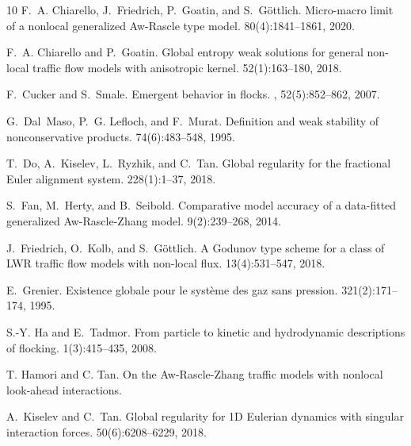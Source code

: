 \documentclass[11pt,a4paper,oneside]{amsart}
\begin{document}
\begin{thebibliography}{10}
 F.~A. Chiarello, J.~Friedrich, P.~Goatin, and S.~G\"ottlich.
\newblock Micro-macro limit of a nonlocal generalized {A}w-{R}ascle type model.
 80(4):1841--1861, 2020.

 F.~A. Chiarello and P.~Goatin.
\newblock Global entropy weak solutions for general non-local traffic flow models with anisotropic kernel.
 52(1):163--180, 2018.

 F.~Cucker and S.~Smale.
\newblock Emergent behavior in flocks.
, 52(5):852–862, 2007.

 G.~Dal~Maso, P.~G. Lefloch, and F.~Murat.
\newblock Definition and weak stability of nonconservative products.
 74(6):483--548, 1995.

 T.~Do, A.~Kiselev, L.~Ryzhik, and C.~Tan.
\newblock Global regularity for the fractional {E}uler alignment system.
 228(1):1--37, 2018.

 S.~Fan, M.~Herty, and B.~Seibold. 
\newblock Comparative model accuracy of a data-fitted generalized {A}w-{R}ascle-{Z}hang model.
 9(2):239–268, 2014.

 J.~Friedrich, O.~Kolb, and S.~G\"ottlich.
\newblock A {G}odunov type scheme for a class of {LWR} traffic flow models with non-local flux.
 13(4):531--547, 2018.

 E.~Grenier.
\newblock Existence globale pour le syst\`eme des gaz sans pression.
 321(2):171--174, 1995.

 S.-Y. Ha and E.~Tadmor.
\newblock From particle to kinetic and hydrodynamic descriptions of flocking.
\newblock {\em \textcolor{black}{Kinet. Relat. Models}} 1(3):415--435, 2008.

 T. Hamori and C. Tan.
\newblock On the Aw-Rascle-Zhang traffic models with nonlocal look-ahead interactions.

 A.~Kiselev and C.~Tan.
\newblock Global regularity for 1{D} {E}ulerian dynamics with singular interaction forces.
 50(6):6208--6229, 2018.


\end{thebibliography}
\end{document}
